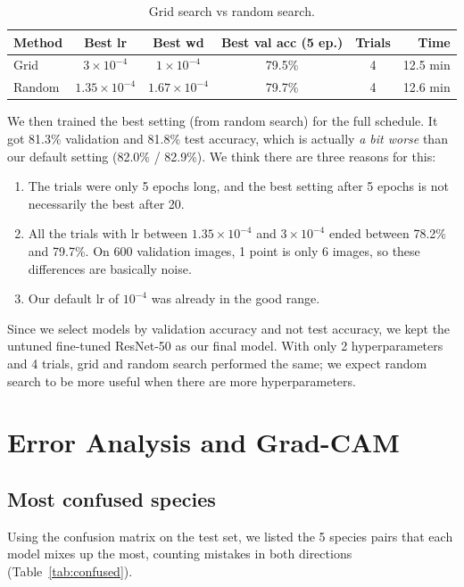 \documentclass[11pt,a4paper]{article}
\begin{document}
\begin{table}[H]
\centering
\small
\begin{tabular}{l c c c c r}
\toprule
\textbf{Method} & \textbf{Best lr} & \textbf{Best wd} & \textbf{Best val acc (5 ep.)} & \textbf{Trials} & \textbf{Time} \\
\midrule
Grid   & $3\times10^{-4}$    & $1\times10^{-4}$    & 79.5\% & 4 & 12.5 min \\
Random & $1.35\times10^{-4}$ & $1.67\times10^{-4}$ & 79.7\% & 4 & 12.6 min \\
\bottomrule
\end{tabular}
\caption{Grid search vs random search.}
\label{tab:tuning}
\end{table}

We then trained the best setting (from random search) for the full schedule. It got 81.3\% validation and 81.8\% test accuracy, which is actually \emph{a bit worse} than our default setting (82.0\% / 82.9\%). We think there are three reasons for this:
\begin{enumerate}
  \item The trials were only 5 epochs long, and the best setting after 5 epochs is not necessarily the best after 20.
  \item All the trials with lr between $1.35\times10^{-4}$ and $3\times10^{-4}$ ended between 78.2\% and 79.7\%. On 600 validation images, 1 point is only 6 images, so these differences are basically noise.
  \item Our default lr of $10^{-4}$ was already in the good range.
\end{enumerate}
Since we select models by validation accuracy and not test accuracy, we kept the untuned fine-tuned ResNet-50 as our final model. With only 2 hyperparameters and 4 trials, grid and random search performed the same; we expect random search to be more useful when there are more hyperparameters.

\section{Error Analysis and Grad-CAM}

\subsection{Most confused species}

Using the confusion matrix on the test set, we listed the 5 species pairs that each model mixes up the most, counting mistakes in both directions (Table~\ref{tab:confused}).
\end{document}
